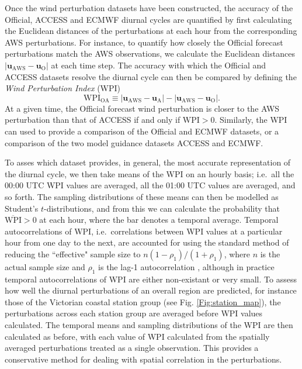 \documentclass{ametsoc}
\begin{document}
Once the wind perturbation datasets have been constructed, the accuracy of the Official, ACCESS and ECMWF diurnal cycles are quantified by first calculating the Euclidean distances of the perturbations at each hour from the corresponding AWS perturbations. For instance, to quantify how closely the Official forecast perturbations match the AWS observations, we calculate the Euclidean distances $\left\lvert \boldsymbol{u}_{\text{AWS}}-\boldsymbol{u}_{\text{O}} \right\rvert$ at each time step. The accuracy with which the Official and ACCESS datasets resolve the diurnal cycle can then be compared by defining the \textit{Wind Perturbation Index} (WPI) 
\begin{equation}
\text{WPI}_\text{OA} \equiv \left\lvert \boldsymbol{u}_{\text{AWS}}-\boldsymbol{u}_{\text{A}} \right\rvert - \left\lvert \boldsymbol{u}_{\text{AWS}}-\boldsymbol{u}_{\text{O}} \right\rvert.
\end{equation} 
At a given time, the Official forecast wind perturbation is closer to the AWS perturbation than that of ACCESS if and only if $\text{WPI} > 0$. Similarly, the WPI can used to provide a comparison of the Official and ECMWF datasets, or a comparison of the two model guidance datasets ACCESS and ECMWF.  

To asses which dataset provides, in general, the most accurate representation of the diurnal cycle, we then take means of the WPI on an hourly basis; i.e.~all the 00:00 UTC WPI values are averaged, all the 01:00 UTC values are averaged, and so forth. The sampling distributions of these means can then be modelled as Student's $t$-distributions, and from this we can calculate the probability that $\overline{\text{WPI}} > 0$ at each hour, where the bar denotes a temporal average. Temporal autocorrelations of WPI, i.e.~correlations between WPI values at a particular hour from one day to the next, are accounted for using the standard method of reducing the ``effective" sample size to $ n \left(1-\rho_1\right)/\left(1+\rho_1\right)$, where $n$ is the actual sample size and $\rho_1$ is the lag-1 autocorrelation \citep{zwiers95,wilks11}, although in practice temporal autocorrelations of WPI are either non-existant or very small. To assess how well the diurnal perturbations of an overall region are predicted, for instance those of the Victorian coastal station group (see Fig. \ref{Fig:station_map}), the perturbations across each station group are averaged before WPI values calculated. The temporal means and sampling distributions of the WPI are then calculated as before, with each value of WPI calculated from the spatially averaged perturbations treated as a single observation. This provides a conservative method for dealing with spatial correlation in the perturbations.        
\end{document}
